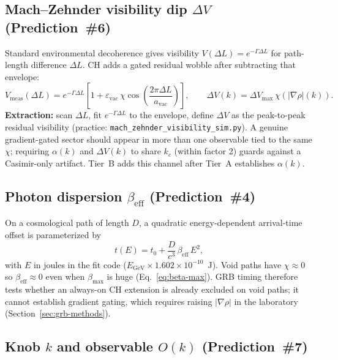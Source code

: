 \documentclass[11pt,a4paper]{article}
\begin{document}
\subsection{Mach--Zehnder visibility dip $\Delta V$ (Prediction~\#6)}

Standard environmental decoherence gives visibility $V(\Delta L) = e^{-\Gamma\Delta L}$ for path-length difference $\Delta L$.
CH adds a gated residual wobble after subtracting that envelope:
\begin{equation}
  V_{\mathrm{meas}}(\Delta L) = e^{-\Gamma\Delta L}\left[1 + \varepsilon_{\mathrm{vac}}\,\chi\cos\!\left(\frac{2\pi\Delta L}{a_{\mathrm{vac}}}\right)\right],
  \qquad
  \Delta V(k) = \Delta V_{\max}\,\chi(|\nabla\rho|(k)).
  \label{eq:mz-vis}
\end{equation}
\textbf{Extraction:} scan $\Delta L$, fit $e^{-\Gamma\Delta L}$ to the envelope, define $\Delta V$ as the peak-to-peak residual visibility (practice: \texttt{mach\_zehnder\_visibility\_sim.py}).
A genuine gradient-gated sector should appear in more than one observable tied to the same $\chi$; requiring $\alpha(k)$ and $\Delta V(k)$ to share $k_c$ (within factor 2) guards against a Casimir-only artifact.
Tier~B adds this channel after Tier~A establishes $\alpha(k)$.

\subsection{Photon dispersion $\beta_{\mathrm{eff}}$ (Prediction~\#4)}

On a cosmological path of length $D$, a quadratic energy-dependent arrival-time offset is parameterized by
\begin{equation}
  t(E) = t_0 + \frac{D}{c^3}\,\beta_{\mathrm{eff}}\,E^2,
  \label{eq:dispersion}
\end{equation}
with $E$ in joules in the fit code ($E_{\mathrm{GeV}} \times 1.602\times 10^{-10}$~J).
Void paths have $\chi \approx 0$ so $\beta_{\mathrm{eff}} \approx 0$ even when $\beta_{\max}$ is huge (Eq.~\ref{eq:beta-max}).
GRB timing therefore tests whether an always-on CH extension is already excluded on void paths; it cannot establish gradient gating, which requires raising $|\nabla\rho|$ in the laboratory (Section~\ref{sec:grb-methods}).

\subsection{Knob $k$ and observable $O(k)$ (Prediction~\#7)}
\end{document}
